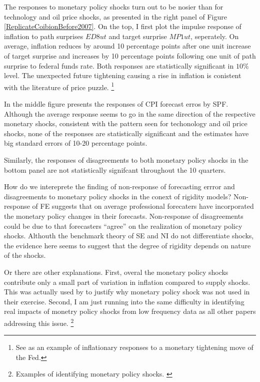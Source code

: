 \documentclass[]{article}
\begin{document}
The responses to monetary policy shocks turn out to be nosier than for technology and oil price shocks, as presented in the right panel of Figure \ref{ReplicateCoibionBefore2007}. On the top, I first plot the impulse response of inflation to path surprises $ED8ut$ and target surprise $MP1ut$, seperately. On average, inflation reduces by around 10 percentage points after one unit increase of target surprise and increases by 10 percentage points following one unit of path surprise to federal funds rate. Both responses are  statistically significant in $10\%$  level. The unexpected future tightening causing a rise in inflation is conistent with the literature of price puzzle. \footnote{See \cite{nakamura2018high} as an example of inflationary responses to a monetary tightening move of the Fed.}

In the middle figure presents the responses of CPI forecast erros by SPF.  Although the average response seems to go in the same direction of the respective monetary shocks, consistent with the pattern seen for techonology and oil price shocks, none of the responses are statistically significant and the estimates have big standard errors of 10-20 percentage points.  

Similarly, the responses of disagreements to both monetary policy shocks in the bottom panel are not statistically signifcant throughout the 10 quarters.  

How do we intereprete the finding of non-response of forecasting errror and disagreements to monetary policy shocks in the conext of rigidity models? Non-response of FE suggests that on average professional forecaters have incorporated the monetary policy changes in their forecasts. Non-response of disagreements could be due to that forecasters ``agree'' on the realization of monetary policy shocks. Althouth the benchmark theory of SE and NI do not differentiate shocks, the evidence here seems to suggest that the degree of rigidity depends on  nature of the shocks. 

Or there are other explanations.  First, overal the monetary policy shocks contribute only a small part of variation in inflation compared to supply shocks. This was actually used by \cite{coibion2012can} to justify why monetary policy shock was not used in their exercise.  Second,  I am just running into the same difficulty in identifying real impacts of monetry policy shocks from low frequency data as all other papers addressing this issue. \footnote{Examples of identifying monetary policy shocks. \cite{xxx} } 
\end{document}
